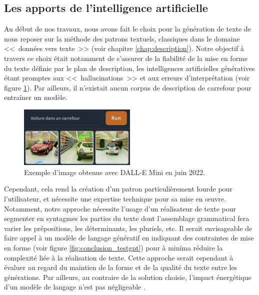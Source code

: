 \subsection{Les apports de l'intelligence artificielle}

Au début de nos travaux, nous avons fait le choix pour la génération de texte de nous reposer sur la méthode des patrons textuels, classiques dans le domaine <<~données vers texte~>> (voir chapitre \ref{chap:description}). Notre objectif à travers ce choix était notamment de s'assurer de la fiabilité de la mise en forme du texte définie par le plan de description, les intelligences artificielles génératives étant promptes aux <<~hallucinations~>> \citep{ye2023} et aux erreurs d'interprétation (voir figure \ref{fig:conclusion_dallemini}). Par ailleurs, il n'existait aucun corpus de description de carrefour pour entraîner un modèle.

\begin{figure}[ht]
    \centering
    \includegraphics[width=0.5\textwidth]{images/conclusion/dallemini_voiture.jpeg}
    \caption[Une voiture dans un carrefour]{Exemple d'image obtenue avec DALL-E Mini en juin 2022.}
    \label{fig:conclusion_dallemini}
\end{figure}

Cependant, cela rend la création d'un patron particulièrement lourde pour l'utilisateur, et nécessite une expertise technique pour sa mise en œuvre. Notamment, notre approche nécessite l'usage d'un réalisateur de texte pour segmenter en syntagmes les parties du texte dont l'assemblage grammatical fera varier les prépositions, les déterminants, les pluriels, etc. Il serait envisageable de faire appel à un modèle de langage génératif en indiquant des contraintes de mise en forme \citep{white2023prompt} (voir figure \ref{fig:conclusion_testgpt}) pour à minima réduire la complexité liée à la réalisation de texte. Cette approche serait cependant à évaluer au regard du maintien de la forme et de la qualité du texte entre les générations. Par ailleurs, au contraire de la solution choisie, l'impact énergétique d'un modèle de langage n'est pas négligeable \citep{devries2023}.

